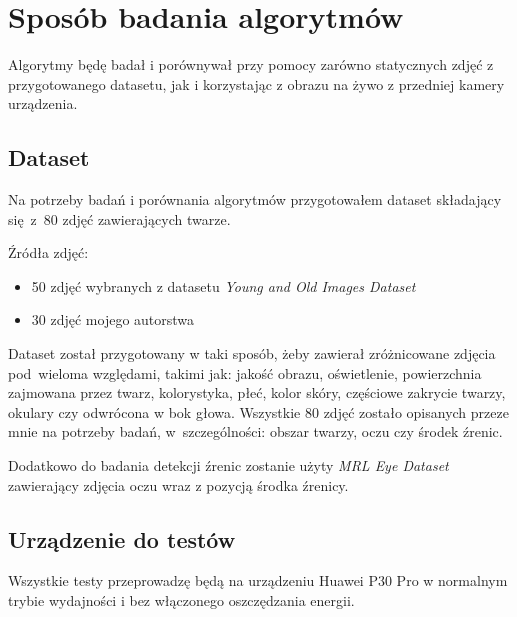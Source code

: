 \newpage 

\section{Sposób badania algorytmów}

Algorytmy będę badał i porównywał przy pomocy zarówno statycznych zdjęć z przygotowanego datasetu, jak i korzystając z obrazu na żywo z przedniej kamery urządzenia.

\subsection{Dataset}
\label{section:dataset}
Na potrzeby badań i porównania algorytmów przygotowałem dataset składający się~z~80 zdjęć zawierających twarze. 
\par
Źródła zdjęć:

\begin{itemize}
    \item 50 zdjęć wybranych z datasetu \textit{Young and Old Images Dataset} \cite{young_old_dataset}
    \item 30 zdjęć mojego autorstwa
\end{itemize}

Dataset został przygotowany w taki sposób, żeby zawierał zróżnicowane zdjęcia pod~wieloma względami, takimi jak: jakość obrazu, oświetlenie, powierzchnia zajmowana przez twarz, kolorystyka, płeć, kolor skóry, częściowe zakrycie twarzy, okulary czy odwrócona w bok głowa. 
Wszystkie 80 zdjęć zostało opisanych przeze mnie na potrzeby badań, w~szczególności: obszar twarzy, oczu czy środek źrenic. 
\par
Dodatkowo do badania detekcji źrenic zostanie użyty \textit{MRL Eye Dataset} \cite{mrl_eye_dataset} zawierający zdjęcia oczu wraz z pozycją środka źrenicy.

\subsection{Urządzenie do testów}

Wszystkie testy przeprowadzę będą na urządzeniu Huawei P30 Pro w normalnym trybie wydajności i bez włączonego oszczędzania energii. 